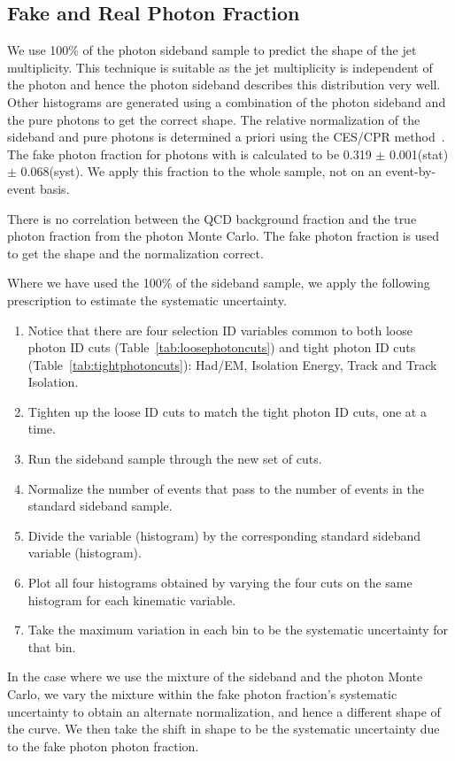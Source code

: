 \documentclass[11pt]{article}
\begin{document}
\subsection{Fake and Real Photon Fraction}
We use 100\% of the photon sideband sample to predict the shape of the jet multiplicity. This technique is suitable as the jet multiplicity is independent of the photon \et and hence the photon sideband describes this distribution very well. Other histograms are generated using a combination of the photon sideband and the pure photons to get the correct shape. The relative normalization of the sideband and pure photons is determined a priori using the CES/CPR method~\cite{wwwCESCPR}. The fake photon fraction for photons with  is calculated to be 0.319 $\pm$ 0.001(stat) $\pm$ 0.068(syst). We apply this fraction to the whole sample, not on an event-by-event basis.

There is no correlation between the QCD background fraction and the true photon fraction from the photon Monte Carlo. The fake photon fraction is used to get the shape and the normalization correct.

Where we have used the 100\% of the sideband sample, we apply the following prescription to estimate the systematic uncertainty.

\begin{enumerate}
\item Notice that there are four selection ID variables common to both loose photon ID cuts (Table~\ref{tab:loosephotoncuts})  and tight photon ID cuts (Table~\ref{tab:tightphotoncuts}):  Had/EM, Isolation Energy, Track \pt and Track Isolation.
\item Tighten up the loose ID cuts to match the tight photon ID cuts, one at a time.
\item Run the sideband sample through the new set of cuts.
\item Normalize the number of events that pass to the number of events in the standard sideband sample.
\item Divide the variable (histogram) by the corresponding standard sideband variable (histogram).
\item Plot all four histograms obtained by varying the four cuts  on the same histogram for each kinematic variable.
\item Take the maximum variation in each bin to be the systematic uncertainty for that bin.
\end{enumerate}

In the case where we use the mixture of the sideband and the photon Monte Carlo, we vary the mixture within the fake photon fraction's systematic uncertainty to obtain an alternate normalization, and hence a different shape of the curve. We then take the shift in shape to be the systematic  uncertainty due to the fake photon photon fraction.
\end{document}
